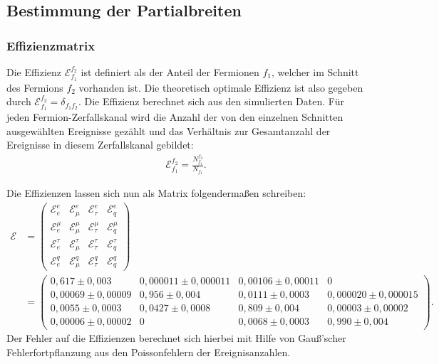 \subsection{Bestimmung der Partialbreiten}

\subsubsection{Effizienzmatrix}

Die Effizienz $\mathcal{E}_{f_1}^{f_2}$ ist definiert als der Anteil der Fermionen $f_1$, welcher im Schnitt des Fermions $f_2$ vorhanden ist. Die theoretisch optimale Effizienz ist also gegeben durch $\mathcal{E}_{f_1}^{f_2}=\delta_{f_1f_2}$. Die Effizienz berechnet sich aus den simulierten Daten. Für jeden Fermion-Zerfallskanal wird die Anzahl der von den einzelnen Schnitten ausgewählten Ereignisse gezählt und das Verhältnis zur Gesamtanzahl der Ereignisse in diesem Zerfallskanal gebildet: 
\begin{align}
	\mathcal{E}_{f_1}^{f_2}=\frac{N_{f_1}^{f_2}}{N_{f_1}}\text{.}
\end{align}

Die Effizienzen lassen sich nun als Matrix folgendermaßen schreiben:
\begin{align}
	\mathcal{E}&=
	\begin{pmatrix}
		\mathcal{E}_{e}^{e}&
		\mathcal{E}_{\mu}^{e}&
		\mathcal{E}_{\tau}^{e}&
		\mathcal{E}_{q}^{e}\\
		\mathcal{E}_{e}^{\mu}&
		\mathcal{E}_{\mu}^{\mu}&
		\mathcal{E}_{\tau}^{\mu}&
		\mathcal{E}_{q}^{\mu}\\
		\mathcal{E}_{e}^{\tau}&
		\mathcal{E}_{\mu}^{\tau}&
		\mathcal{E}_{\tau}^{\tau}&
		\mathcal{E}_{q}^{\tau}\\
		\mathcal{E}_{e}^{q}&
		\mathcal{E}_{\mu}^{q}&
		\mathcal{E}_{\tau}^{q}&
		\mathcal{E}_{q}^{q}
	\end{pmatrix}
	\\&=
	\begin{pmatrix}
		0,617\pm0,003&0,000011\pm0,000011&0,00106\pm0,00011&0\\
		0,00069\pm0,00009&0,956\pm0,004&0,0111\pm0,0003&0,000020\pm0,000015\\
		0,0055\pm0,0003&0,0427\pm0,0008&0,809\pm0,004&0,00003\pm0,00002\\
		0,00006\pm0,00002&0&0,0068\pm0,0003&0,990\pm0,004
	\end{pmatrix}\text{.}
\end{align}
Der Fehler auf die Effizienzen berechnet sich hierbei mit Hilfe von Gauß'scher Fehlerfortpflanzung aus den Poissonfehlern der Ereignisanzahlen.\\

